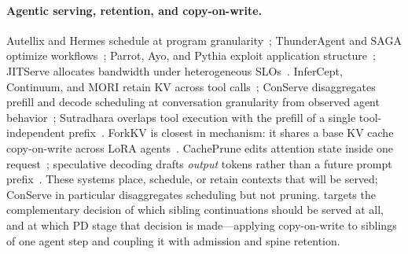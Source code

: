 \paragraph{Agentic serving, retention, and copy-on-write.}
Autellix and Hermes schedule at program granularity~\cite{autellix,hermes}; ThunderAgent and SAGA optimize workflows~\cite{thunderagent,saga}; Parrot, Ayo, and Pythia exploit application structure~\cite{parrot,ayo,pythia}; JITServe allocates bandwidth under heterogeneous SLOs~\cite{jitserve}.
InferCept, Continuum, and MORI retain KV across tool calls~\cite{infercept,continuum,mori}; ConServe disaggregates prefill and decode scheduling at conversation granularity from observed agent behavior~\cite{conserve}; Sutradhara overlaps tool execution with the prefill of a single tool-independent prefix~\cite{sutradhara}.
ForkKV is closest in mechanism: it shares a base KV cache copy-on-write across LoRA agents~\cite{forkkv}.
CachePrune edits attention state inside one request~\cite{cacheprune}; speculative decoding drafts \emph{output} tokens rather than a future prompt prefix~\cite{speculative,medusa,eagledraft}.
These systems place, schedule, or retain contexts that will be served; ConServe in particular disaggregates scheduling but not pruning.
\sys targets the complementary decision of which sibling continuations should be served at all, and at which PD stage that decision is made---applying copy-on-write to siblings of one agent step and coupling it with admission and spine retention.


